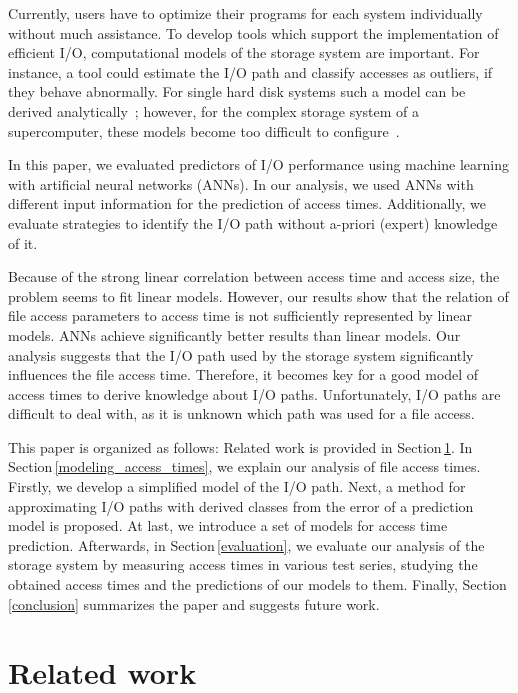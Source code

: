 \documentclass{superfri}
\begin{document}
	Currently, users have to optimize their programs for each system individually without much assistance.
	To develop tools which support the implementation of efficient I/O, computational models of the storage system are important.
	For instance, a tool could estimate the I/O path and classify accesses as outliers, if they behave abnormally.
	For single hard disk systems such a model can be derived analytically~\cite{Ruemmler94anintroduction}; however, for the complex storage system of a supercomputer, these models become too difficult to configure~\cite{DBLP:conf/npc/ZhangLZJC10}.
	
	In this paper, we evaluated predictors of I/O performance using machine learning with artificial neural networks (ANNs).
	In our analysis, we used ANNs with different input information for the prediction of access times.
	Additionally, we evaluate strategies to identify the I/O path without a-priori (expert) knowledge of it.
	
	Because of the strong linear correlation between access time and access size, the problem seems to fit linear models.
	However, our results show that the relation of file access parameters to access time is not sufficiently represented by linear models.
	ANNs achieve significantly better results than linear models.
	Our analysis suggests that the I/O path used by the storage system significantly influences the file access time.
	Therefore, it becomes key for a good model of access times to derive knowledge about I/O paths.
	Unfortunately, I/O paths are difficult to deal with, as it is unknown which path was used for a file access.
	
	This paper is organized as follows:
	Related work is provided in Section\,\ref{sec:related}.
	In Section\,\ref{modeling_access_times}, we explain our analysis of file access times. 
	Firstly, we develop a simplified model of the I/O path. 
	Next, a method for approximating I/O paths with derived classes from the error of a prediction model is proposed. 
	At last, we introduce a set of models for access time prediction.
	Afterwards, in Section\,\ref{evaluation}, we evaluate our analysis of the storage system by measuring access times in various test series, studying the obtained access times and the predictions of our models to them.
	Finally, Section\,\ref{conclusion} summarizes the paper and suggests future work.
	
	\section{Related work}
	\label{sec:related}
	
\end{document}
